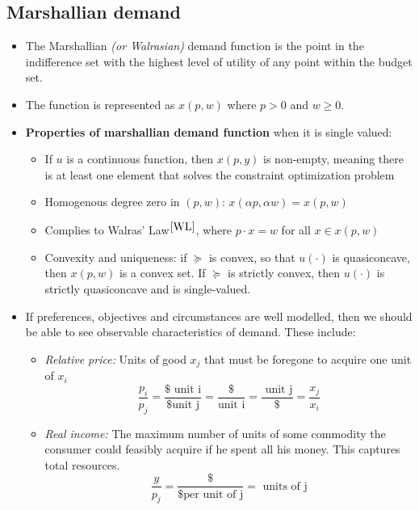 \documentclass{article}
\begin{document}
\subsection{Marshallian demand}
\begin{itemize}
    \item The Marshallian \textit{(or Walrasian)} demand function is the point in the indifference set with the highest level of utility of any point within the budget set. 
    \item The function is represented as $x(p,w)$ where $p > 0$ and $w \geq 0$. 
    \item \textbf{Properties of marshallian demand function} when it is single valued:
    \begin{itemize}
        \item If $u$ is a continuous function, then $x(p,y)$ is non-empty, meaning there is at least one element that solves the constraint optimization problem 
        \item Homogenous degree zero in $(p,w)$: $x(\alpha p, \alpha w) = x(p,w)$
        \item Complies to Walras' Law$^{\ref{WL}}$, where $p \cdot x = w$ for all $x \in x(p,w)$
        \item Convexity and uniqueness: if $\succeq$ is convex, so that $u(\cdot)$ is quasiconcave, then $x(p,w)$ is a convex set. If $\succeq$ is strictly convex, then $u(\cdot)$ is strictly quasiconcave and is single-valued. 
    \end{itemize}
    \item If preferences, objectives and circumstances are well modelled, then we should be able to see observable characteristics of demand. These include:
    \begin{itemize}
        \item \textit{Relative price:} Units of good $x_j$ that must be foregone to acquire one unit of $x_i$
        \[
        \frac{p_i}{p_j} = \frac{\$ \text{ unit i}}{\$ \text{unit j}} = \frac{\$}{\text{unit i}} = \frac{\text{ unit j}}{\$} = \frac{x_j}{x_i}
        \]
        \item \textit{Real income:} The maximum number of units of some commodity the consumer could feasibly acquire if he spent all his money. This captures total resources. 
        \[
        \frac{y}{p_j} = \frac{\$}{\$ \text{per unit of j}} = \text{ units of j}
        \]
    \end{itemize}
\end{itemize}
\end{document}
